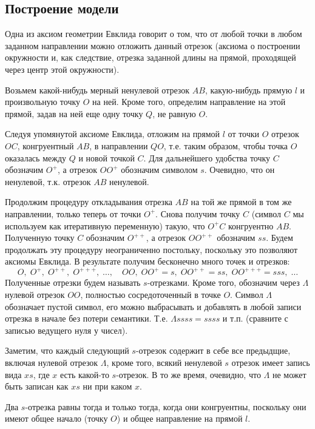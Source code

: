 \subsection{Построение модели}

Одна из аксиом геометрии Евклида говорит о том, что от любой точки в любом заданном направлении можно отложить данный отрезок (аксиома о построении окружности и, как следствие, отрезка заданной длины на прямой, проходящей через центр этой окружности).

Возьмем какой-нибудь мерный ненулевой отрезок $AB$, какую-нибудь прямую $l$ и произвольную точку $O$ на ней. Кроме того, определим направление на этой прямой, задав на ней еще одну точку $Q$, не равную $O$.

Следуя упомянутой аксиоме Евклида, отложим на прямой $l$ от точки $O$ отрезок $OC$, конгруентный $AB$, в направлении $QO$, т.е. таким образом, чтобы точка $O$ оказалась между $Q$ и новой точкой $C$. Для дальнейшего удобства точку $C$ обозначим $O^+$, а отрезок $OO^+$ обозначим символом $s$. Очевидно, что он ненулевой, т.к. отрезок $AB$ ненулевой.

Продолжим процедуру откладывания отрезка $AB$ на той же прямой в том же направлении, только теперь от точки $O^+$. Снова получим точку $C$ (символ $C$ мы используем как итеративную переменную) такую, что $O^+C$ конгруентно $AB$. Полученную точку $C$ обозначим $O^{++}$, а отрезок $OO^{++}$ обозначим $ss$. Будем продолжать эту процедуру неограниченно постольку, поскольку это позволяют аксиомы Евклида. В результате получим бесконечно много точек и отрезков:
$$
O,\;O^+,\;O^{++},\;O^{+++},\;\dots,\quad OO,\;OO^+=s,\;OO^{++}=ss,\;OO^{+++}=sss,\;\dots
$$
Полученные отрезки будем называть $s$-отрезками. Кроме того, обозначим через $\Lambda$ нулевой отрезок $OO$, полностью сосредоточенный в точке $O$. Символ $\Lambda$ обозначает пустой символ, его можно выбрасывать и добавлять в любой записи отрезка в начале без потери семантики. Т.е. $\Lambda ssss=ssss$ и т.п. (сравните с записью ведущего нуля у чисел).

Заметим, что каждый следующий $s$-отрезок содержит в себе все предыдщие, включая нулевой отрезок $\Lambda$, кроме того, всякий ненулевой $s$ отрезок имеет запись вида $xs$, где $x$ есть какой-то $s$-отрезок. В то же время, очевидно, что $\Lambda$ не может быть записан как $xs$ ни при каком $x$.

Два $s$-отрезка равны тогда и только тогда, когда они конгруентны, поскольку они имеют общее начало (точку $O$) и общее направление на прямой $l$.

